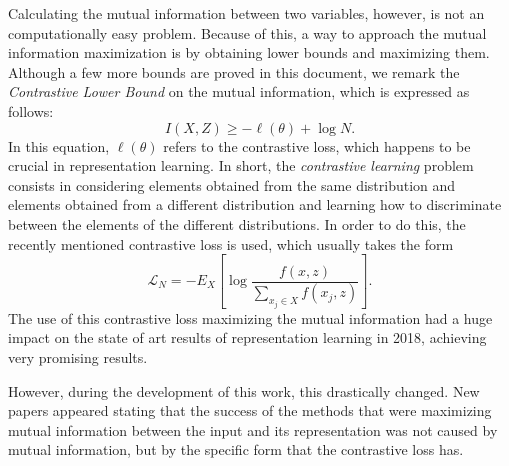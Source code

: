 Calculating the mutual information between two variables, however, is not an computationally easy problem. Because of this, a way to approach the mutual information maximization is by obtaining lower bounds and maximizing them. Although a few more bounds are proved in this document, we remark the \emph{Contrastive Lower Bound} on the mutual information, which is expressed as follows:
\[
I(X,Z)  \geq - \ell(\theta) + \log N.
\]
In this equation, $\ell(\theta)$ refers to the contrastive loss, which happens to be crucial in representation learning. In short, the \emph{contrastive learning} problem consists in considering elements obtained from the same distribution and elements obtained from a different distribution and learning how to discriminate between the elements of the different distributions. In order to do this, the recently mentioned contrastive loss is used, which usually takes the form
\[
\mathcal L_N = - E_X \left[ \log \frac{f(x,z)}{\sum_{x_j \in X}f(x_j,z)}\right].
\]  
The use of this contrastive loss maximizing the mutual information had a huge impact on the state of art results of representation learning in 2018, achieving very promising results.

However, during the development of this work, this drastically changed. New papers appeared stating that the success of the methods that were maximizing mutual information between the input and its representation was not caused by mutual information, but by the specific form that the contrastive loss has.